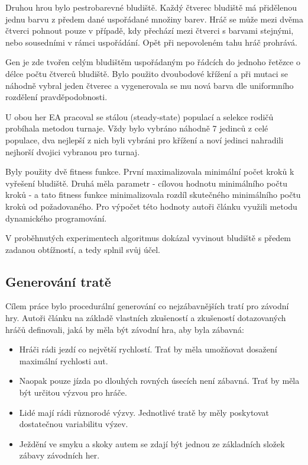 Druhou hrou bylo pestrobarevné bludiště. Každý čtverec bludiště má přidělenou jednu barvu z předem dané uspořádané množiny barev. Hráč se může mezi dvěma čtverci pohnout pouze v případě, kdy přechází mezi čtverci s barvami stejnými, nebo sousedními v rámci uspořádání. Opět při nepovoleném tahu hráč prohrává.

Gen je zde tvořen celým bludištěm uspořádaným po řádcích do jednoho řetězce o délce počtu čtverců bludiště. Bylo použito dvoubodové křížení a při mutaci se náhodně vybral jeden čtverec a vygenerovala se mu nová barva dle uniformního rozdělení pravděpodobnosti.

U obou her EA pracoval se stálou (steady-state) populací a selekce rodičů probíhala metodou turnaje. Vždy bylo vybráno náhodně 7 jedinců z celé populace, dva nejlepší z nich byli vybráni pro křížení a noví jedinci nahradili nejhorší dvojici vybranou pro turnaj.

Byly použity dvě fitness funkce. První maximalizovala minimální počet kroků k vyřešení bludiště. Druhá měla parametr - cílovou hodnotu minimálního počtu kroků - a tato fitness funkce minimalizovala rozdíl skutečného minimálního počtu kroků od požadovaného. Pro výpočet této hodnoty autoři článku využili metodu dynamického programování.

V proběhnutých experimentech algoritmus dokázal vyvinout bludiště s předem zadanou obtížností, a tedy splnil svůj účel.

\subsection{Generování tratě}

Cílem práce \cite{EvolTrack} bylo procedurální generování co nejzábavnějších tratí pro závodní hry. Autoři článku na základě vlastních zkušeností a zkušeností dotazovaných hráčů definovali, jaká by měla být závodní hra, aby byla zábavná:

\begin{itemize}
	\item Hráči rádi jezdí co největší rychlostí. Trať by měla umožňovat dosažení maximální rychlosti aut.
	\item Naopak pouze jízda po dlouhých rovných úsecích není zábavná. Trať by měla být určitou výzvou pro hráče.
	\item Lidé mají rádi různorodé výzvy. Jednotlivé tratě by měly poskytovat dostatečnou variabilitu výzev.
	\item Ježdění ve smyku a skoky autem se zdají být jednou ze základních složek zábavy závodních her.
\end{itemize}

